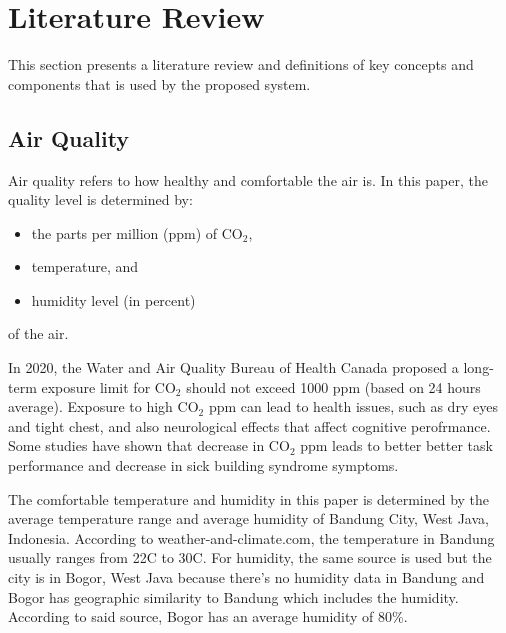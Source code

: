 \section{Literature Review}

This section presents a literature review and definitions of key concepts and
components that is used by the proposed system.

\subsection{Air Quality}

Air quality refers to how healthy and comfortable the air is. In this paper, the
quality level is determined by:
\begin{itemize}
	\item the parts per million (ppm) of CO$_2$,
	\item temperature, and
	\item humidity level (in percent)
\end{itemize}
of the air.

In 2020, the Water and Air Quality Bureau of Health Canada proposed a long-term
exposure limit for CO$_2$ should not exceed 1000 ppm (based on 24 hours
average). Exposure to high CO$_2$ ppm can lead to health issues, such as dry
eyes and tight chest, and also neurological effects that affect cognitive
perofrmance. Some studies have shown that decrease in CO$_2$ ppm leads to better
better task performance and decrease in sick building syndrome
symptoms\cite{co2_ppm_max}.

The comfortable temperature and humidity in this paper is determined by the
average temperature range and average humidity of Bandung City, West Java,
Indonesia. According to weather-and-climate.com, the temperature in Bandung
usually ranges from 22\textdegree C to 30\textdegree C\cite{temperature_max}.
For humidity, the same source is used but the city is in Bogor, West Java
because there's no humidity data in Bandung and Bogor has geographic similarity
to Bandung which includes the humidity. According to said source, Bogor has an
average humidity of 80\%\cite{humidity_max}.


